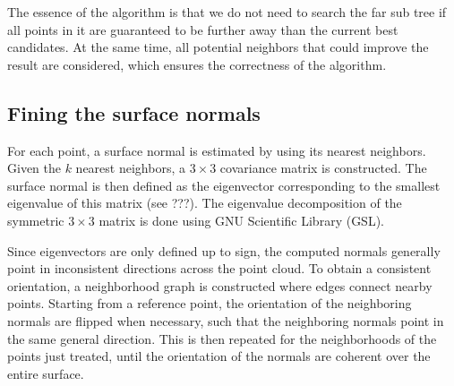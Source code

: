 \documentclass[10pt,a4paper,final]{article}
\begin{document}
The essence of the algorithm is that we do not need to search the far sub tree if all points in it are guaranteed to be further away than the current best candidates. At the same time, all potential neighbors that could improve the result are considered, which ensures the correctness of the algorithm.

\subsection{Fining the surface normals}
For each point, a surface normal is estimated by using its nearest neighbors. Given the $k$ nearest neighbors, a $3\times3$ covariance matrix is constructed. The surface normal is then defined as the eigenvector corresponding to the smallest eigenvalue of this matrix (see ???). The eigenvalue decomposition of the symmetric $3\times3$ matrix is done using GNU Scientific Library (GSL).

Since eigenvectors are only defined up to sign, the computed normals generally point in inconsistent directions across the point cloud. To obtain a consistent orientation, a neighborhood graph is constructed where edges connect nearby points. Starting from a reference point, the orientation of the neighboring normals are flipped when necessary, such that the neighboring normals point in the same general direction. This is then repeated for the neighborhoods of the points just treated, until the orientation of the normals are coherent over the entire surface.
\end{document}
